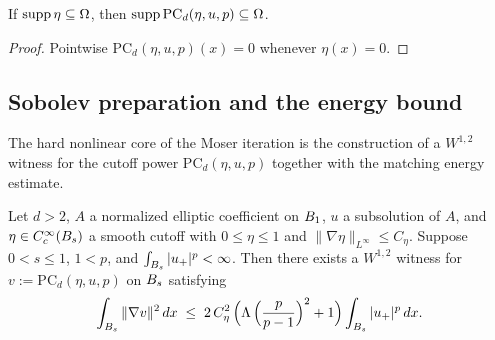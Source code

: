 \begin{lemma}
\label{lem:moserPowerCutoff_tsupport_subset}
\leanok
If $\operatorname{supp} \eta \subseteq \Omega$, then
$\operatorname{supp} \mathrm{PC}_d(\eta,u,p) \subseteq \Omega$.
\end{lemma}

\begin{proof}
\leanok

Pointwise $\mathrm{PC}_d(\eta,u,p)(x) = 0$ whenever $\eta(x)=0$.
\end{proof}

\subsection{Sobolev preparation and the energy bound}

The hard nonlinear core of the Moser iteration is the construction of a
$W^{1,2}$ witness for the cutoff power $\mathrm{PC}_d(\eta,u,p)$ together with
the matching energy estimate.

\begin{theorem}
\label{thm:moser-cutoff-energy}
\leanok
{}
Let $d > 2$, $A$ a normalized elliptic coefficient on $B_{1}$, $u$ a
subsolution of $A$, and $\eta \in C^{\infty}_c(B_{s})$ a smooth cutoff with
$0 \leq \eta \leq 1$ and $\|\nabla \eta\|_{L^\infty} \leq C_\eta$. Suppose
$0 < s \leq 1$, $1 < p$, and $\int_{B_{s}} |u_+|^p < \infty$. Then there
exists a $W^{1,2}$ witness for $v := \mathrm{PC}_d(\eta,u,p)$ on $B_{s}$
satisfying
\begin{equation*}
  \int_{B_{s}} \|\nabla v\|^{2}\,dx
  \;\leq\;
  2\,C_\eta^{2}\,\Big(\Lambda\,\Big(\frac{p}{p-1}\Big)^{2} + 1\Big)
  \int_{B_{s}} |u_+|^{p}\,dx.
\end{equation*}
\end{theorem}

